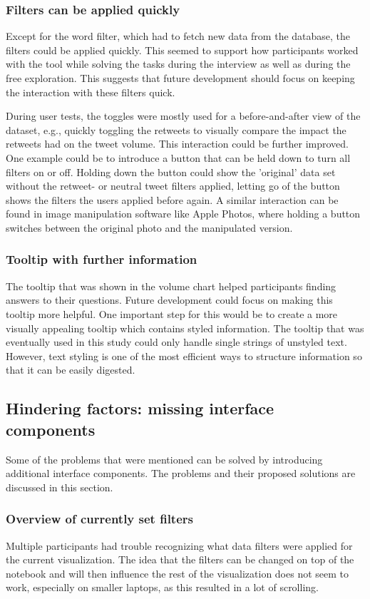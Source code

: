 \subsubsection*{Filters can be applied quickly}
Except for the word filter, which had to fetch new data from the database, the filters could be applied quickly. This seemed to support how participants worked with the tool while solving the tasks during the interview as well as during the free exploration. This suggests that future development should focus on keeping the interaction with these filters quick.

During user tests, the toggles were mostly used for a before-and-after view of the dataset, e.g., quickly toggling the retweets to visually compare the impact the retweets had on the tweet volume. This interaction could be further improved. One example could be to introduce a button that can be held down to turn all filters on or off. Holding down the button could show the 'original' data set without the retweet- or neutral tweet filters applied, letting go of the button shows the filters the users applied before again. A similar interaction can be found in image manipulation software like Apple Photos, where holding a button switches between the original photo and the manipulated version.

\subsubsection*{Tooltip with further information}
The tooltip that was shown in the volume chart helped participants finding answers to their questions. Future development could focus on making this tooltip more helpful. One important step for this would be to create a more visually appealing tooltip which contains styled information. The tooltip that was eventually used in this study could only handle single strings of unstyled text. However, text styling is one of the most efficient ways to structure information so that it can be easily digested. 

\subsection{Hindering factors: missing interface components}
Some of the problems that were mentioned can be solved by introducing additional interface components. The problems and their proposed solutions are discussed in this section.

\subsubsection*{Overview of currently set filters}
Multiple participants had trouble recognizing what data filters were applied for the current visualization. The idea that the filters can be changed on top of the notebook and will then influence the rest of the visualization does not seem to work, especially on smaller laptops, as this resulted in a lot of scrolling.

